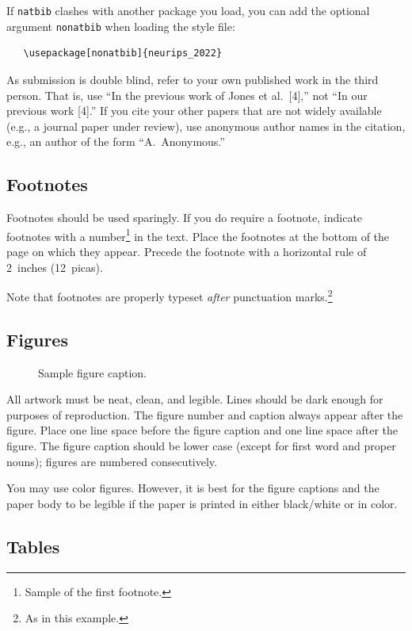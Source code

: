 \documentclass{article}
\begin{document}
If \verb+natbib+ clashes with another package you load, you can add the optional
argument \verb+nonatbib+ when loading the style file:
\begin{verbatim}
   \usepackage[nonatbib]{neurips_2022}
\end{verbatim}


As submission is double blind, refer to your own published work in the third
person. That is, use ``In the previous work of Jones et al.\ [4],'' not ``In our
previous work [4].'' If you cite your other papers that are not widely available
(e.g., a journal paper under review), use anonymous author names in the
citation, e.g., an author of the form ``A.\ Anonymous.''


\subsection{Footnotes}


Footnotes should be used sparingly.  If you do require a footnote, indicate
footnotes with a number\footnote{Sample of the first footnote.} in the
text. Place the footnotes at the bottom of the page on which they appear.
Precede the footnote with a horizontal rule of 2~inches (12~picas).


Note that footnotes are properly typeset \emph{after} punctuation
marks.\footnote{As in this example.}


\subsection{Figures}


\begin{figure}
  \centering
  \fbox{\rule[-.5cm]{0cm}{4cm} \rule[-.5cm]{4cm}{0cm}}
  \caption{Sample figure caption.}
\end{figure}


All artwork must be neat, clean, and legible. Lines should be dark enough for
purposes of reproduction. The figure number and caption always appear after the
figure. Place one line space before the figure caption and one line space after
the figure. The figure caption should be lower case (except for first word and
proper nouns); figures are numbered consecutively.


You may use color figures.  However, it is best for the figure captions and the
paper body to be legible if the paper is printed in either black/white or in
color.


\subsection{Tables}
\end{document}

